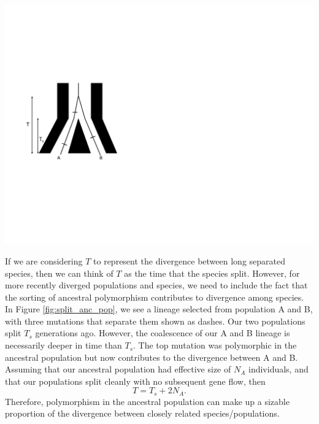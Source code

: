 \begin{marginfigure}
\begin{center}
\includegraphics[width=0.8 \textwidth]{figures/Genetic_drift/ILS/split_anc_pop.pdf}
\end{center}
\caption{} \label{fig:split_anc_pop}  
\end{marginfigure} 



If we are considering $T$ to represent the divergence between long
separated species, then we can think of $T$ as the time that the
species split. However, for more recently diverged populations and
species, we need to include the fact that the sorting of ancestral
polymorphism contributes to divergence among species. In Figure 
\ref{fig:split_anc_pop}, we see a lineage selected from population A
and B, with three mutations that separate them shown as dashes. Our two populations split $T_s$ generations ago.  However, the
coalescence of our A and B lineage is necessarily deeper in time than
$T_s$. The top mutation was polymorphic in the ancestral population
but now contributes to the divergence between A and B. Assuming that
our ancestral population had effective size of $N_A$ individuals, and
that our populations split cleanly with no subsequent gene flow, then
\begin{equation}
T = T_s + 2N_A.
\end{equation}
Therefore, polymorphism in the ancestral population can make up a
sizable proportion of the divergence between closely related
species/populations. 



